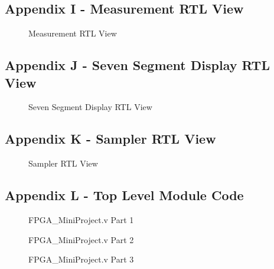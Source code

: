 \documentclass[a4paper,12pt]{article}
\begin{document}
\subsection{Appendix I - Measurement RTL View}
\begin{figure}[H]
	\centering
	\caption{Measurement RTL View}
\end{figure}
\newpage
\subsection{Appendix J - Seven Segment Display RTL View}
\begin{figure}[H]
	\centering
	\caption{Seven Segment Display RTL View}
\end{figure}
\newpage
\subsection{Appendix K - Sampler RTL View}
\begin{figure}[H]
	\centering
	\caption{Sampler RTL View}
\end{figure}
\newpage
\subsection{Appendix L - Top Level Module Code}
\begin{figure}[H]
	\centering
	
		\caption{FPGA\_MiniProject.v Part 1}
\end{figure}
\begin{figure}[H]
	\centering
	
		\caption{FPGA\_MiniProject.v Part 2}
\end{figure}
\begin{figure}[H]
	\centering
	
		\caption{FPGA\_MiniProject.v Part 3}
\end{figure}
\newpage
\end{document}
